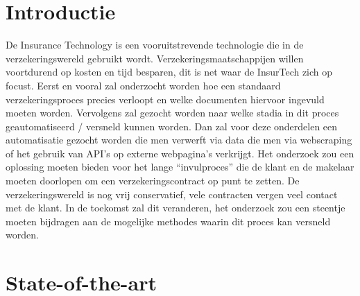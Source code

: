 
\section{Introductie} %
\label{sec:introductie}

De Insurance Technology is een vooruitstrevende technologie die in de verzekeringswereld gebruikt wordt.
Verzekeringsmaatschappijen willen voortdurend op kosten en tijd besparen, dit is net waar de InsurTech zich op focust.
Eerst en vooral zal onderzocht worden hoe een standaard verzekeringsproces precies verloopt en welke documenten hiervoor ingevuld moeten worden. Vervolgens zal gezocht worden naar welke stadia in dit proces geautomatiseerd / versneld kunnen worden.
Dan zal voor deze onderdelen een automatisatie gezocht worden die men verwerft via data die men via webscraping of het gebruik van API’s op externe webpagina’s verkrijgt.
Het onderzoek zou een oplossing moeten bieden voor het lange “invulproces” die de klant en de makelaar moeten doorlopen om een verzekeringscontract op punt te zetten.
De verzekeringswereld is nog vrij conservatief, vele contracten vergen veel contact met de klant. In de toekomst zal dit veranderen, het onderzoek zou een steentje moeten bijdragen aan de mogelijke methodes waarin dit proces kan versneld worden.


\section{State-of-the-art}
\label{sec:state-of-the-art}

